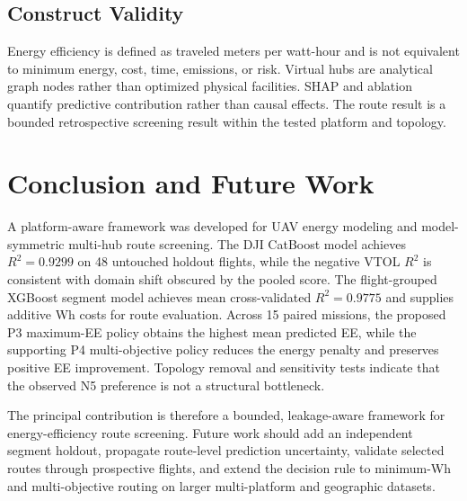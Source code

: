\documentclass[conference,a4paper]{IEEEtran}
\begin{document}
\subsection{Construct Validity}
Energy efficiency is defined as traveled meters per watt-hour and is not equivalent to minimum energy, cost, time, emissions, or risk. Virtual hubs are analytical graph nodes rather than optimized physical facilities. SHAP and ablation quantify predictive contribution rather than causal effects. The route result is a bounded retrospective screening result within the tested platform and topology.

\section{Conclusion and Future Work}
A platform-aware framework was developed for UAV energy modeling and model-symmetric multi-hub route screening. The DJI CatBoost model achieves $R^2=0.9299$ on 48 untouched holdout flights, while the negative VTOL $R^2$ is consistent with domain shift obscured by the pooled score. The flight-grouped XGBoost segment model achieves mean cross-validated $R^2=0.9775$ and supplies additive Wh costs for route evaluation. Across 15 paired missions, the proposed P3 maximum-EE policy obtains the highest mean predicted EE, while the supporting P4 multi-objective policy reduces the energy penalty and preserves positive EE improvement. Topology removal and sensitivity tests indicate that the observed N5 preference is not a structural bottleneck.

The principal contribution is therefore a bounded, leakage-aware framework for energy-efficiency route screening. Future work should add an independent segment holdout, propagate route-level prediction uncertainty, validate selected routes through prospective flights, and extend the decision rule to minimum-Wh and multi-objective routing on larger multi-platform and geographic datasets.

\balance
\end{document}
